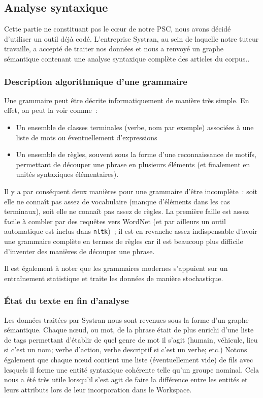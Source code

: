 \documentclass[a4paper, 12pt]{article}
\newcommand{\pyt}[1]{\texttt{#1}}%
\begin{document}
\subsection{Analyse syntaxique}

Cette partie ne constituant pas le c\oe{}ur de notre PSC, nous avons décidé d'utiliser un outil déjà codé. L'entreprise Systran, au sein de laquelle notre tuteur travaille, a accepté de traiter nos données et nous a renvoyé un graphe sémantique contenant une analyse syntaxique complète des articles du corpus..

\subsubsection{Description algorithmique d'une grammaire}
Une grammaire peut être décrite informatiquement de manière très simple. En effet, on peut la voir comme~:
\begin{itemize}
	\item Un ensemble de classes terminales (verbe, nom par exemple) associées à une liste de mots ou éventuellement d'expressions
	\item Un ensemble de règles, souvent sous la forme d'une reconnaissance de motifs, permettant de découper une phrase en plusieurs éléments (et finalement en unités syntaxiques élémentaires).
\end{itemize}

Il y a par conséquent deux manières pour une grammaire d'être incomplète~: soit elle ne connaît pas assez de vocabulaire (manque d'éléments dans les cas terminaux), soit elle ne connaît pas assez de règles. La première faille est assez facile à combler par des requêtes vers WordNet (et par ailleurs un outil automatique est inclus dans \pyt{nltk})~; il est en revanche assez indispensable d'avoir une grammaire complète en termes de règles car il est beaucoup plus difficile d'inventer des manières de découper une phrase.

Il est également à noter que les grammaires modernes s'appuient sur un entraînement statistique et traite les données de manière stochastique.

\subsubsection{\'Etat du texte en fin d'analyse}
Les données traitées par Systran nous sont revenues sous la forme d'un graphe sémantique. Chaque nœud, ou mot, de la phrase était de plus enrichi d'une liste de tags permettant d'établir de quel genre de mot il s'agit (humain, véhicule, lieu si c'est un nom; verbe d'action, verbe descriptif si c'est un verbe; etc.) Notons également que chaque nœud contient une liste (éventuellement vide) de fils avec lesquels il forme une entité syntaxique cohérente telle qu'un groupe nominal. Cela nous a été très utile lorsqu'il s'est agit de faire la différence entre les entités et leurs attributs lors de leur incorporation dans le Workspace.
\end{document}
